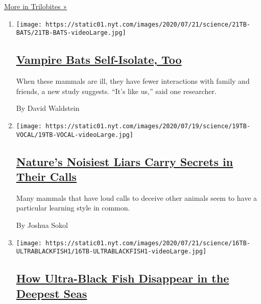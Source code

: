 \href{/column/trilobites}{More in Trilobites »}

\begin{enumerate}
\def\labelenumi{\arabic{enumi}.}
\item
  \texttt{[image: https://static01.nyt.com/images/2020/07/21/science/21TB-BATS/21TB-BATS-videoLarge.jpg]}

  \hypertarget{vampire-bats-self-isolate-too}{%
  \subsection{\texorpdfstring{\href{/2020/07/22/science/vampire-bats-viruses.html}{Vampire
  Bats Self-Isolate,
  Too}}{Vampire Bats Self-Isolate, Too}}\label{vampire-bats-self-isolate-too}}

  When these mammals are ill, they have fewer interactions with family
  and friends, a new study suggests. ``It's like us,'' said one
  researcher.

  By David Waldstein
\item
  \texttt{[image: https://static01.nyt.com/images/2020/07/19/science/19TB-VOCAL/19TB-VOCAL-videoLarge.jpg]}

  \hypertarget{natures-noisiest-liars-carry-secrets-in-their-calls}{%
  \subsection{\texorpdfstring{\href{/2020/07/21/science/mammals-vocal-learning.html}{Nature's
  Noisiest Liars Carry Secrets in Their
  Calls}}{Nature's Noisiest Liars Carry Secrets in Their Calls}}\label{natures-noisiest-liars-carry-secrets-in-their-calls}}

  Many mammals that have loud calls to deceive other animals seem to
  have a particular learning style in common.

  By Joshua Sokol
\item
  \texttt{[image: https://static01.nyt.com/images/2020/07/21/science/16TB-ULTRABLACKFISH1/16TB-ULTRABLACKFISH1-videoLarge.jpg]}

  \hypertarget{how-ultra-black-fish-disappear-in-the-deepest-seas}{%
  \subsection{\texorpdfstring{\href{/2020/07/16/science/ultra-black-fish.html}{How
  Ultra-Black Fish Disappear in the Deepest
  Seas}}{How Ultra-Black Fish Disappear in the Deepest Seas}}\label{how-ultra-black-fish-disappear-in-the-deepest-seas}}


\end{enumerate}
